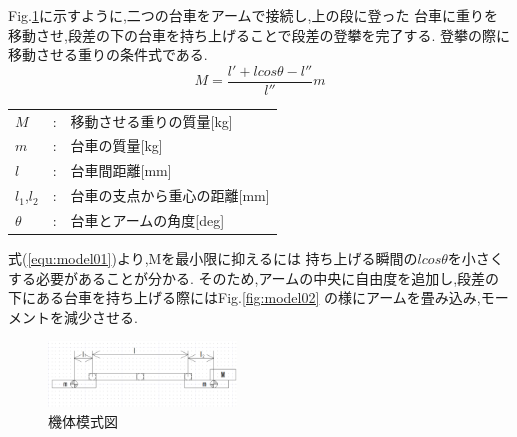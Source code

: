 \documentclass[dvipdfmx]{jsarticle}
\begin{document}
Fig.\ref{fig:model01}に示すように,二つの台車をアームで接続し,上の段に登った
台車に重りを移動させ,段差の下の台車を持ち上げることで段差の登攀を完了する.
登攀の際に移動させる重りの条件式である.
\begin{equation}
  M=\frac{l'+lcos\theta-l''}{l''}m
\label{equ:model01}
\end{equation}
\begin{table}[H]
    \begin{tabular}{lcl}
      $M$ & : & 移動させる重りの質量[kg]\\
      $m$ & : & 台車の質量[kg]\\
      $l$ & : & 台車間距離[mm]\\
      $l_1$,$l_2$  & : & 台車の支点から重心の距離[mm]\\
      $\theta$ & : & 台車とアームの角度[deg]\\
  \end{tabular}
\end{table}
式(\ref*{equ:model01})より,Mを最小限に抑えるには
持ち上げる瞬間の$lcos\theta$を小さくする必要があることが分かる.
そのため,アームの中央に自由度を追加し,段差の下にある台車を持ち上げる際にはFig.\ref{fig:model02}
の様にアームを畳み込み,モーメントを減少させる.
\begin{figure}[H]
  \centering
  \includegraphics[width=50mm]{image/model01}
  \caption{機体模式図}
\label{fig:model01}
\end{figure}
\end{document}
